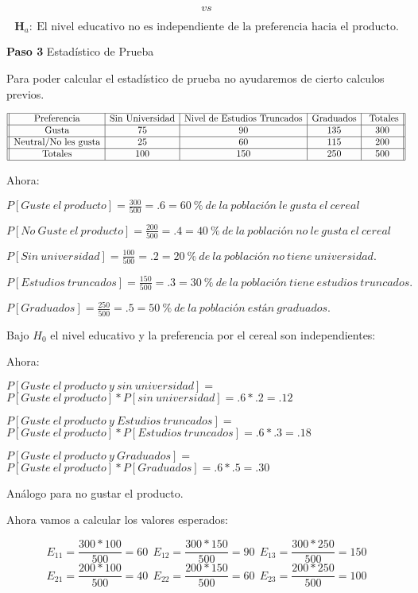 \documentclass[
  a4paper,
  oneside,
  openany]{book}
\begin{document}
\[vs\]

\[\textbf{H}_a:\ \mbox{El nivel educativo no es independiente de la preferencia hacia el producto.}\]

\textbf{Paso 3} Estadístico de Prueba

Para poder calcular el estadístico de prueba no ayudaremos de cierto calculos previos.

\[
\begin{array}{||c| c| c |c |c||} 
\hline 
\mbox{Preferencia}& \mbox{Sin Universidad}&\mbox{Nivel de Estudios Truncados}&\mbox{Graduados} &\mbox{ Totales} \\  
 \hline
\mbox{Gusta}&75&90&135&300\\
 \hline
\mbox{Neutral/No les gusta}&25&60&115&200\\
 \hline
\mbox{Totales}&100&150&250&500\\
 \hline
\end{array}
\]

Ahora:

\(P[Guste\ el\ producto]= \frac{300}{500}=.6= 60\ \%\ de\ la\ población\ le\ gusta\ el\ cereal\)

\(P[No\ Guste\ el\ producto]= \frac{200}{500}=.4= 40\ \%\ de\ la\ población\ no\ le\ gusta\ el\ cereal\)

\(P[Sin\ universidad]= \frac{100}{500}=.2= 20\ \%\ de\ la\ población\ no\ tiene\ universidad.\)

\(P[Estudios\ truncados]= \frac{150}{500}=.3= 30\ \%\ de\ la\ población\ tiene\ estudios\ truncados.\)

\(P[Graduados]= \frac{250}{500}=.5= 50\ \%\ de\ la\ población\ están\ graduados.\)

Bajo \(H_0\) el nivel educativo y la preferencia por el cereal son independientes:

Ahora:

\(P[Guste\ el\ producto\ y\ sin\ universidad]=\)
\(P[Guste\ el\ producto]*P[sin\ universidad]=.6*.2=.12\)

\(P[Guste\ el\ producto\ y\ Estudios\ truncados]=\)
\(P[Guste\ el\ producto]*P[Estudios\ truncados]=.6*.3=.18\)

\(P[Guste\ el\ producto\ y\ Graduados]=\)
\(P[Guste\ el\ producto]*P[Graduados]=.6*.5=.30\)

Análogo para no gustar el producto.

Ahora vamos a calcular los valores esperados:

\[E_{11}=\frac{300*100}{500}=60 \ \ E_{12}=\frac{300*150}{500}=90 \ \  E_{13}=\frac{300*250}{500}=150\]
\[E_{21}=\frac{200*100}{500}=40 \ \  E_{22}=\frac{200*150}{500}=60 \ \ E_{23}=\frac{200*250}{500}=100\]
\end{document}
